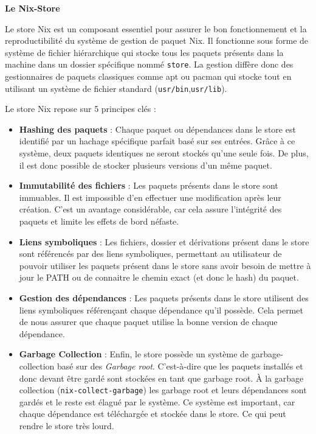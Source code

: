 \documentclass[a4paper,french,12pt, titlepage]{article}
\begin{document}
\textbf{Le Nix-Store}\newline

Le store Nix est un composant essentiel pour assurer le bon
fonctionnement et la reproductibilité du système de gestion de paquet
Nix. Il fonctionne sous forme de système de fichier hiérarchique qui
stocke tous les paquets présents dans la machine dans un dossier
spécifique nommé \texttt{store}. La gestion diffère donc des
gestionnaires de paquets classiques comme apt ou pacman qui stocke tout
en utilisant un système de fichier standard
(\texttt{usr/bin},\texttt{usr/lib}).\newline

Le store Nix repose sur 5 principes clés :

\begin{itemize}
\item
  \textbf{Hashing des paquets} : Chaque paquet ou dépendances dans le
  store est identifié par un hachage spécifique parfait basé sur ses
  entrées. Grâce à ce système, deux paquets identiques ne seront stockés
  qu'une seule fois. De plus, il est donc possible de stocker plusieurs
  versions d'un même paquet.
\item
  \textbf{Immutabilité des fichiers} : Les paquets présents dans le
  store sont immuables. Il est impossible d'en effectuer une
  modification après leur création. C'est un avantage considérable, car
  cela assure l'intégrité des paquets et limite les effets de bord
  néfaste.
\item
  \textbf{Liens symboliques} : Les fichiers, dossier et dérivations
  présent dans le store sont référencés par des liens symboliques,
  permettant au utilisateur de pouvoir utiliser les paquets présent dans
  le store sans avoir besoin de mettre à jour le PATH ou de connaitre le
  chemin exact (et donc le hash) du paquet.
\item
  \textbf{Gestion des dépendances} : Les paquets présents dans le store
  utilisent des liens symboliques référençant chaque dépendance qu'il
  possède. Cela permet de nous assurer que chaque paquet utilise la
  bonne version de chaque dépendance.
\item
  \textbf{Garbage Collection} : Enfin, le store possède un système de
  \gls{garbage-collection} basé sur des \emph{Garbage root}.
  C'est-à-dire que les paquets installés et donc devant être gardé sont
  stockées en tant que garbage root. À la garbage collection
  (\texttt{nix-collect-garbage}) les garbage root et leurs dépendances
  sont gardés et le reste est élagué par le système. Ce système est
  important, car chaque dépendance est téléchargée et stockée dans le
  store. Ce qui peut rendre le store très lourd.\newline
\end{itemize}
\end{document}
